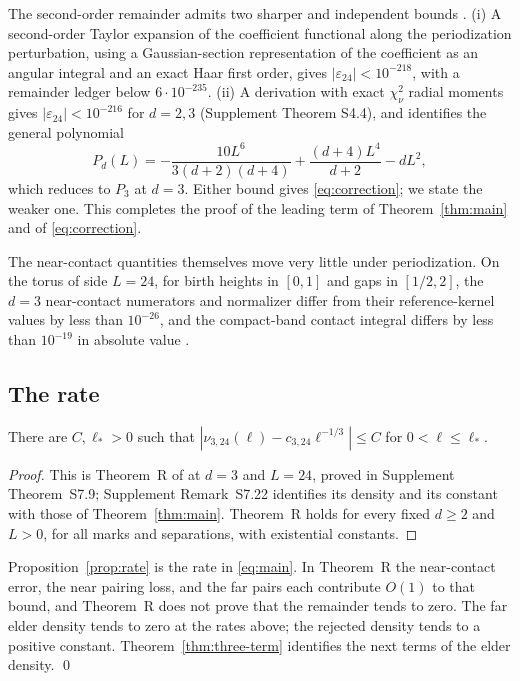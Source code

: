 The second-order remainder admits two sharper and independent bounds . (i) A second-order Taylor expansion of the coefficient functional along the periodization perturbation, using a Gaussian-section representation of the coefficient as an angular integral and an exact Haar first order, gives $|\varepsilon_{24}|<10^{-218}$, with a remainder ledger below $6\cdot10^{-235}$. (ii) A derivation with exact $\chi^2_\nu$ radial moments gives $|\varepsilon_{24}|<10^{-216}$ for $d=2,3$ (Supplement Theorem S4.4), and identifies the general polynomial
\[
P_d(L)=-\frac{10L^6}{3(d+2)(d+4)}+\frac{(d+4)L^4}{d+2}-dL^2,
\]
which reduces to $P_3$ at $d=3$. Either bound gives \eqref{eq:correction}; we state the weaker one. This completes the proof of the leading term of Theorem~\ref{thm:main} and of \eqref{eq:correction}.

\begin{remark}\label{rem:c104}
The near-contact quantities themselves move very little under periodization. On the torus of side $L=24$, for birth heights in $[0,1]$ and gaps in $[1/2,2]$, the $d=3$ near-contact numerators and normalizer differ from their reference-kernel values by less than $10^{-26}$, and the compact-band contact integral differs by less than $10^{-19}$ in absolute value .
\end{remark}

\subsection{The rate}\label{ssec:rate}

\begin{proposition}\label{prop:rate}
There are $C,\ell_*>0$ such that $|\nu_{3,24}(\ell)-c_{3,24}\ell^{-1/3}|\le C$ for $0<\ell\le\ell_*$.
\end{proposition}

\begin{proof}
This is Theorem~R of  at $d=3$ and $L=24$, proved in Supplement Theorem~S7.9; Supplement Remark~S7.22 identifies its density and its constant with those of Theorem~\ref{thm:main}. Theorem~R holds for every fixed $d\ge2$ and $L>0$, for all marks and separations, with existential constants.
\end{proof}

Proposition~\ref{prop:rate} is the rate in \eqref{eq:main}. In Theorem~R the near-contact error, the near pairing loss, and the far pairs each contribute $O(1)$ to that bound, and Theorem~R does not prove that the remainder tends to zero. The far elder density tends to zero at the rates above; the rejected density tends to a positive constant. Theorem~\ref{thm:three-term} identifies the next terms of the elder density. \qed
